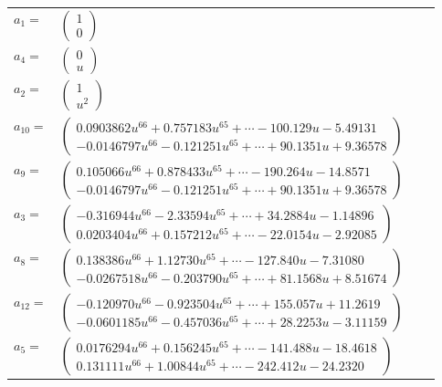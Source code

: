 \documentclass[1p]{elsarticle_modified}
\theoremstyle{definition}
\begin{document}
\begin{tabular}{m{7pt} m{180pt} m{7pt} m{180pt} }
\flushright $a_{1}=$&$\begin{pmatrix}1\\0\end{pmatrix}$ \\
\flushright $a_{4}=$&$\begin{pmatrix}0\\u\end{pmatrix}$ \\
\flushright $a_{2}=$&$\begin{pmatrix}1\\u^2\end{pmatrix}$ \\
\flushright $a_{10}=$&$\begin{pmatrix}0.0903862 u^{66}+0.757183 u^{65}+\cdots-100.129 u-5.49131\\-0.0146797 u^{66}-0.121251 u^{65}+\cdots+90.1351 u+9.36578\end{pmatrix}$ \\
\flushright $a_{9}=$&$\begin{pmatrix}0.105066 u^{66}+0.878433 u^{65}+\cdots-190.264 u-14.8571\\-0.0146797 u^{66}-0.121251 u^{65}+\cdots+90.1351 u+9.36578\end{pmatrix}$ \\
\flushright $a_{3}=$&$\begin{pmatrix}-0.316944 u^{66}-2.33594 u^{65}+\cdots+34.2884 u-1.14896\\0.0203404 u^{66}+0.157212 u^{65}+\cdots-22.0154 u-2.92085\end{pmatrix}$ \\
\flushright $a_{8}=$&$\begin{pmatrix}0.138386 u^{66}+1.12730 u^{65}+\cdots-127.840 u-7.31080\\-0.0267518 u^{66}-0.203790 u^{65}+\cdots+81.1568 u+8.51674\end{pmatrix}$ \\
\flushright $a_{12}=$&$\begin{pmatrix}-0.120970 u^{66}-0.923504 u^{65}+\cdots+155.057 u+11.2619\\-0.0601185 u^{66}-0.457036 u^{65}+\cdots+28.2253 u-3.11159\end{pmatrix}$ \\
\flushright $a_{5}=$&$\begin{pmatrix}0.0176294 u^{66}+0.156245 u^{65}+\cdots-141.488 u-18.4618\\0.131111 u^{66}+1.00844 u^{65}+\cdots-242.412 u-24.2320\end{pmatrix}$ \\

\end{tabular}
\end{document}
